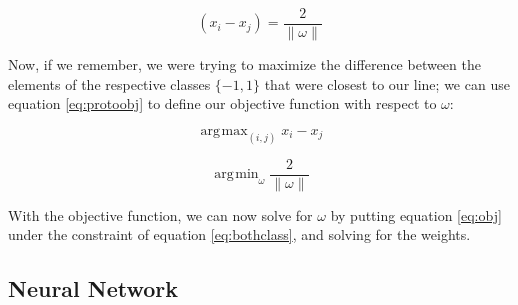 \documentclass[a4paper]{comjnl}
\newcommand{\norm}[1]{\lVert #1 \rVert}
\DeclareMathOperator*{\argmax}{\arg\!\max}
\DeclareMathOperator*{\argmin}{\arg\!\min}
\numberwithin{equation}{subsection}
\begin{document}
            \begin{equation}\label{eq:protoobj}
                (x_i-x_j)=\frac{2}{\norm{\omega}}
            \end{equation}

            \noindent Now, if we remember, we were trying to maximize the difference between the
            elements of the respective classes $\{-1,1\}$ that were closest to our line; we can use
            equation \eqref{eq:protoobj} to define our objective function with respect to $\omega$:

            \begin{equation*}
                \argmax_{(i,j)} x_i-x_j
            \end{equation*}

            \begin{equation}\label{eq:obj}
                \argmin_{\omega} \frac{2}{\norm{\omega}}
            \end{equation}

            \noindent With the objective function, we can now solve for $\omega$ by putting equation
            \eqref{eq:obj} under the constraint of equation \eqref{eq:bothclass}, and solving for
            the weights.

        \subsection{Neural Network}\label{subsec:nnet}
\end{document}
